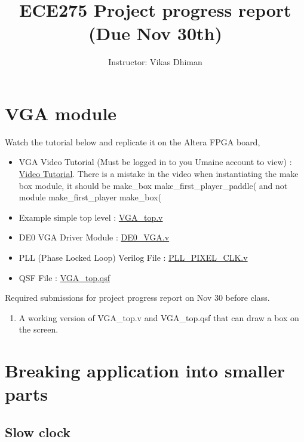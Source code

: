\documentclass{article}
\begin{document}
\title{ECE275 Project progress report (Due Nov 30th)}
\author{Instructor: Vikas Dhiman}
\maketitle

\section{VGA module}

Watch the tutorial below and replicate it on the Altera FPGA board,

\begin{itemize}
\item
  VGA Video Tutorial (Must be logged in to you Umaine account to view) :
  \href{https://drive.google.com/file/d/1KwSqLo8CvzKBAjxMmDpdbc_UMAonZH9S/view?usp=sharing}{Video
  Tutorial}.
  There is a mistake in the video when instantiating the make box
  module, it should be make\_box make\_first\_player\_paddle( and not
  module make\_first\_player make\_box(
\item
  Example simple top level :
  \href{https://vikasdhiman.info/ECE275-Sequential-Logic/lab_pdfs/final_project_vga_files/VGA_top.v}{VGA\_top.v}
\item
  DE0 VGA Driver Module :
  \href{https://vikasdhiman.info/ECE275-Sequential-Logic/lab_pdfs/final_project_vga_files/DE0_VGA.v}{DE0\_VGA.v}
\item
  PLL (Phase Locked Loop) Verilog File :
  \href{https://vikasdhiman.info/ECE275-Sequential-Logic/lab_pdfs/final_project_vga_files/PLL_PIXEL_CLK.v}{PLL\_PIXEL\_CLK.v}
\item
  QSF File :
  \href{https://vikasdhiman.info/ECE275-Sequential-Logic/lab_pdfs/final_project_vga_files/VGA_top.qsf}{VGA\_top.qsf}
\end{itemize}

{\color{red}
  Required submissions for project progress report on Nov 30 before class.
  \begin{enumerate}
  \item A working version of VGA\_top.v and VGA\_top.qsf that can draw a box on
    the screen.
  \end{enumerate}
}


\section{Breaking application into smaller parts }
\subsection{Slow clock}
\end{document}
